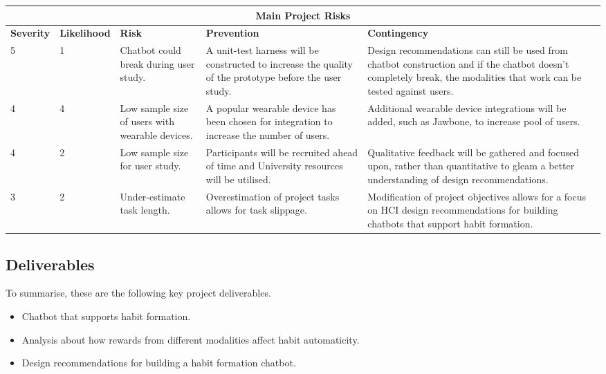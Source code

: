 \renewcommand{\arraystretch}{1.5} %

\begin{center}
\begin{tabular}{ |p{1.5cm}|p{1.9cm}|p{2.3cm}|p{3.3cm}|p{5cm}| }
  \hline \multicolumn{5}{|c|}{Main Project Risks} \\ \hline %
  \textbf{Severity} & \textbf{Likelihood} & \textbf{Risk} & \textbf{Prevention} & \textbf{Contingency} \\ \hline %
  5 & 1 & Chatbot could break during user study. & A unit-test harness will be constructed to increase the quality of the prototype before the user study. & Design recommendations can still be used from chatbot construction and if the chatbot doesn't completely break, the modalities that work can be tested against users. \\ \hline
  4 & 4 & Low sample size of users with wearable devices. & A popular wearable device has been chosen for integration to increase the number of users. & Additional wearable device integrations will be added, such as Jawbone, to increase pool of users. \\ \hline
  4 & 2 & Low sample size for user study. & Participants will be recruited ahead of time and University resources will be utilised. & Qualitative feedback will be gathered and focused upon, rather than quantitative to gleam a better understanding of design recommendations.\\ \hline
  3 & 2 & Under-estimate task length. & Overestimation of project tasks allows for task slippage. & Modification of project objectives allows for a focus on HCI design recommendations for building chatbots that support habit formation. \\ \hline
\end{tabular}
\end{center}

\subsection{Deliverables}
To summarise, these are the following key project deliverables.

\begin{itemize}
  \item Chatbot that supports habit formation.
  \item Analysis about how rewards from different modalities affect habit automaticity.
  \item Design recommendations for building a habit formation chatbot.
\end{itemize}
